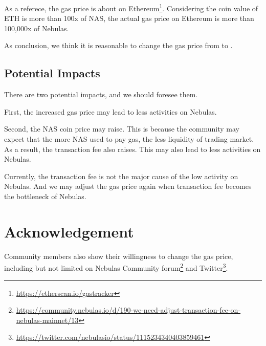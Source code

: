 \documentclass[11pt]{article}
\begin{document}
As a referece, the gas price is about  on Ethereum\footnote{\url{https://etherscan.io/gastracker}}. Considering the coin value of ETH is more than 100x of NAS, the actual gas price on Ethereum is more than 100,000x of Nebulas.

As conclusion, we think it is reasonable to change the gas price from  to .

\subsection{Potential Impacts}
There are two potential impacts, and we should foresee them.

First, the increased gas price may lead to less activities on Nebulas.

Second, the NAS coin price may raise. This is because the community may expect
that the more NAS used to pay gas, the less liquidity of trading market. As a result,
the transaction fee also raises. This may also lead to less activities on Nebulas.

\vspace{1em}
Currently, the transaction fee is not the major cause of the low activity on Nebulas.
And we may adjust the gas price again when transaction fee becomes the bottleneck of Nebulas.
\section{Acknowledgement}
Community members also show their willingness to change the gas price, including but not limited on Nebulas Community forum\footnote{\url{https://community.nebulas.io/d/190-we-need-adjust-transaction-fee-on-nebulas-mainnet/13}} and Twitter\footnote{\url{https://twitter.com/nebulasio/status/1115234340403859461}}.
\end{document}
